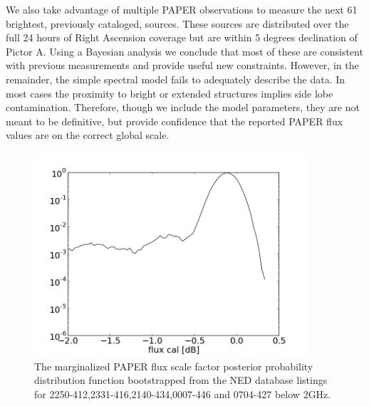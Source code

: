 \documentclass[preprint]{aastex}
\begin{document}
We also take advantage of multiple PAPER observations to measure the next  61 brightest, previously cataloged, sources. These sources are distributed over the full 24 hours of Right Ascension coverage but are within 5 degrees declination of Pictor A.  Using a Bayesian analysis we conclude that most of these are consistent with previous measurements and provide useful new constraints. However, in the remainder, the simple spectral model fails to adequately describe the data. In most cases the proximity to bright or extended structures implies side lobe contamination.  Therefore, though we include the model parameters, they are not meant to be definitive, but provide confidence that the reported PAPER flux values are on the correct global scale.



\begin{figure}
\centering
\includegraphics[width=0.9\textwidth]{plots/2250-412_2331-416_2140-434_0007-446_0704-427_gain_mcmc_chain_gain_conf.png}

\caption{The marginalized PAPER flux scale factor posterior probability distribution function bootstrapped from the NED database listings for 2250-412,2331-416,2140-434,0007-446 and 0704-427 below 2GHz.  \label{fig:gain}}
\end{figure}
\end{document}
